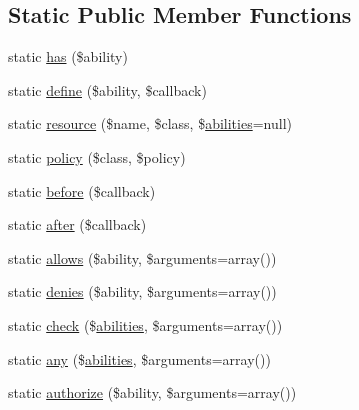 \subsection*{Static Public Member Functions}
\begin{DoxyCompactItemize}
\item 
static \mbox{\hyperlink{class_illuminate_1_1_support_1_1_facades_1_1_gate_a707cb199ec72119e5b85c25ad235004e}{has}} (\$ability)
\item 
static \mbox{\hyperlink{class_illuminate_1_1_support_1_1_facades_1_1_gate_af7f90f854ea9d7ce6c6d4a7665caeed4}{define}} (\$ability, \$callback)
\item 
static \mbox{\hyperlink{class_illuminate_1_1_support_1_1_facades_1_1_gate_a291645da3113160b150c1aec559cc28e}{resource}} (\$name, \$class, \$\mbox{\hyperlink{class_illuminate_1_1_support_1_1_facades_1_1_gate_ae4c194dfa7fc3157b19cfdd34a9eb989}{abilities}}=null)
\item 
static \mbox{\hyperlink{class_illuminate_1_1_support_1_1_facades_1_1_gate_ac9b97caa9e0f2149bf81706cffaaa49d}{policy}} (\$class, \$policy)
\item 
static \mbox{\hyperlink{class_illuminate_1_1_support_1_1_facades_1_1_gate_ac81a01d99657d6fc1e10dfff4faec994}{before}} (\$callback)
\item 
static \mbox{\hyperlink{class_illuminate_1_1_support_1_1_facades_1_1_gate_a18080477d595d620db9332f9d829503a}{after}} (\$callback)
\item 
static \mbox{\hyperlink{class_illuminate_1_1_support_1_1_facades_1_1_gate_acb9d26a32e44d841b4a374dc0aba8fb4}{allows}} (\$ability, \$arguments=array())
\item 
static \mbox{\hyperlink{class_illuminate_1_1_support_1_1_facades_1_1_gate_af5f76847d390f8c4d1092bee4a916f8e}{denies}} (\$ability, \$arguments=array())
\item 
static \mbox{\hyperlink{class_illuminate_1_1_support_1_1_facades_1_1_gate_ac4825419bb8e7a48b4ba1542f93ee3eb}{check}} (\$\mbox{\hyperlink{class_illuminate_1_1_support_1_1_facades_1_1_gate_ae4c194dfa7fc3157b19cfdd34a9eb989}{abilities}}, \$arguments=array())
\item 
static \mbox{\hyperlink{class_illuminate_1_1_support_1_1_facades_1_1_gate_a2527f977b0a27705cdd3b3300ae172bb}{any}} (\$\mbox{\hyperlink{class_illuminate_1_1_support_1_1_facades_1_1_gate_ae4c194dfa7fc3157b19cfdd34a9eb989}{abilities}}, \$arguments=array())
\item 
static \mbox{\hyperlink{class_illuminate_1_1_support_1_1_facades_1_1_gate_aa235db9683cd7d125fbd65a666172758}{authorize}} (\$ability, \$arguments=array())

\end{DoxyCompactItemize}
